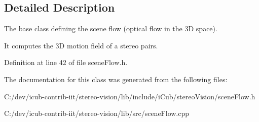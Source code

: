 \subsection{Detailed Description}
The base class defining the scene flow (optical flow in the 3D space). 

It computes the 3D motion field of a stereo pairs. 

Definition at line 42 of file scene\+Flow.\+h.



The documentation for this class was generated from the following files\+:\begin{DoxyCompactItemize}
\item 
C\+:/dev/icub-\/contrib-\/iit/stereo-\/vision/lib/include/i\+Cub/stereo\+Vision/scene\+Flow.\+h\item 
C\+:/dev/icub-\/contrib-\/iit/stereo-\/vision/lib/src/scene\+Flow.\+cpp\end{DoxyCompactItemize}
